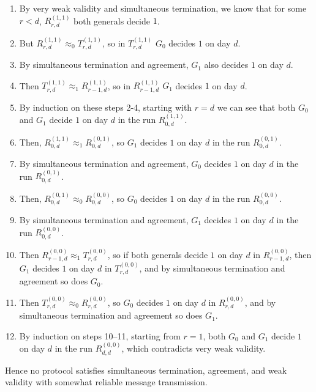 \documentclass[12pt]{article}
\begin{document}
\begin{solution}
    \begin{enumerate}
        \item By very weak validity and simultaneous termination, we know that for some $r < d$, $R_{r,d}^{(1,1)}$ both generals decide $1$.
        \item But $R_{r,d}^{(1,1)} \approx_0 T_{r, d}^{(1,1)}$, so in $T_{r, d}^{(1,1)}$ $G_0$ decides $1$ on day $d$. 
        \item By simultaneous termination and agreement, $G_1$ also decides $1$ on day $d$. 
        \item Then $T_{r,d}^{(1,1)} \approx_1 R_{r-1, d}^{(1,1)}$, so in $R_{r-1, d}^{(1,1)}$ $G_1$ decides $1$ on day $d$.
        \item By induction on these steps 2-4, starting with $r = d$ we can see that both $G_0$ and $G_1$ decide $1$ on day $d$ in the run $R_{0,d}^{(1,1)}$. 
        \item Then, $R_{0,d}^{(1,1)} \approx_1 R_{0, d}^{(0,1)}$, so $G_1$ decides $1$ on day $d$ in the run $R_{0,d}^{(0,1)}$. 
        \item By simultaneous termination and agreement, $G_0$ decides $1$ on day $d$ in the run $R_{0,d}^{(0,1)}$. 
        \item Then, $R_{0,d}^{(0,1)} \approx_0 R_{0, d}^{(0,0)}$, so $G_0$ decides $1$ on day $d$ in the run $R_{0,d}^{(0,0)}$.
        \item By simultaneous termination and agreement, $G_1$ decides $1$ on day $d$ in the run $R_{0,d}^{(0,0)}$.
        \item Then $R_{r-1,d}^{(0,0)} \approx_1 T_{r,d}^{(0,0)}$, so if both generals decide $1$ on day $d$ in $R_{r-1,d}^{(0,0)}$, then $G_1$ decides $1$ on day $d$ in $T_{r,d}^{(0,0)}$, and by simultaneous termination and agreement so does $G_0$.
        \item Then $T_{r,d}^{(0,0)} \approx_0 R_{r,d}^{(0,0)}$, so $G_0$ decides $1$ on day $d$ in $R_{r,d}^{(0,0)}$, and by simultaneous termination and agreement so does $G_1$.
        \item By induction on steps 10--11, starting from $r = 1$, both $G_0$ and $G_1$ decide $1$ on day $d$ in the run $R_{d,d}^{(0,0)}$, which contradicts very weak validity.
    \end{enumerate}
    Hence no protocol satisfies simultaneous termination, agreement, and weak validity with somewhat reliable message transmission.
\end{solution}
\end{document}
